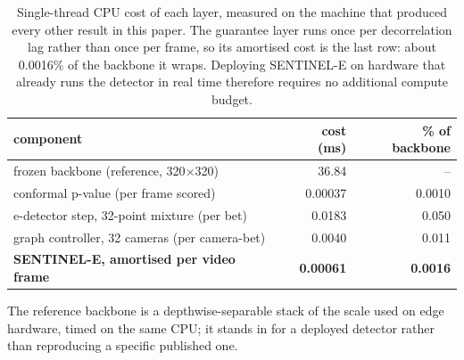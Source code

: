 \begin{table}[t]
\centering
\caption{Single-thread CPU cost of each layer, measured on the machine that produced every other result in this paper. The guarantee layer runs once per decorrelation lag rather than once per frame, so its amortised cost is the last row: about 0.0016\% of the backbone it wraps. Deploying SENTINEL-E on hardware that already runs the detector in real time therefore requires no additional compute budget.}
\label{tab:compute}
\begin{tabular}{lrr}
\toprule
component & cost (ms) & \% of backbone \\
\midrule
frozen backbone (reference, 320$\times$320) & 36.84 & -- \\
conformal p-value (per frame scored) & 0.00037 & 0.0010 \\
e-detector step, 32-point mixture (per bet) & 0.0183 & 0.050 \\
graph controller, 32 cameras (per camera-bet) & 0.0040 & 0.011 \\
\textbf{SENTINEL-E, amortised per video frame} & \textbf{0.00061} & \textbf{0.0016} \\
\bottomrule
\end{tabular}
\begin{minipage}{\linewidth}\vspace{2pt}\footnotesize The reference backbone is a depthwise-separable stack of the scale used on edge hardware, timed on the same CPU; it stands in for a deployed detector rather than reproducing a specific published one.\end{minipage}
\end{table}
